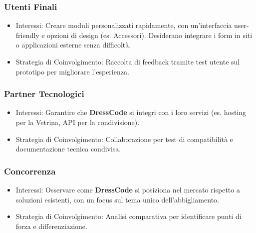\subsubsection{Utenti Finali}
\begin{itemize}
\item Interessi: Creare moduli personalizzati rapidamente, con un'interfaccia user-friendly e opzioni di design (es. Accessori). Desiderano integrare i form in siti o applicazioni esterne senza difficoltà. \\
\item Strategia di Coinvolgimento: Raccolta di feedback tramite test utente sul prototipo per migliorare l'esperienza.
\end{itemize}

\subsubsection{Partner Tecnologici}
\begin{itemize}
\item Interessi: Garantire che \textbf{DressCode} si integri con i loro servizi (es. hosting per la Vetrina, API per la condivisione). \\
\item Strategia di Coinvolgimento: Collaborazione per test di compatibilità e documentazione tecnica condivisa.
\end{itemize}

\subsubsection{Concorrenza}
\begin{itemize}
\item Interessi: Osservare come \textbf{DressCode} si posiziona nel mercato rispetto a soluzioni esistenti, con un focus sul tema unico dell'abbigliamento. \\
\item Strategia di Coinvolgimento: Analisi comparativa per identificare punti di forza e differenziazione.
\end{itemize}

\pagebreak
